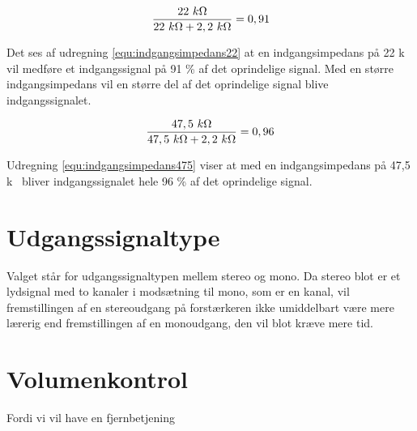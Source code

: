 \begin{equation}
\label{equ:indgangsimpedans22}
\frac{22~k\ohm}{22~k\ohm + 2,2~k\ohm} = 0,91
\end{equation}

Det ses af udregning \ref{equ:indgangsimpedans22} at en indgangsimpedans på 22 k\ohm~ vil medføre et indgangssignal på 91 \% af det oprindelige signal. Med en større indgangsimpedans vil en større del af det oprindelige signal blive indgangssignalet. 

\begin{equation}
\label{equ:indgangsimpedans475}
\frac{47,5~k\ohm}{47,5~k\ohm + 2,2~k\ohm} = 0,96
\end{equation}

Udregning \ref{equ:indgangsimpedans475} viser at med en indgangsimpedans på 47,5 k\ohm~ bliver indgangssignalet hele 96 \% af det oprindelige signal.

\section{Udgangssignaltype}
\label{krav_udgangssignaltype}
Valget står for udgangssignaltypen mellem stereo og mono. Da stereo blot er et lydsignal med to kanaler i modsætning til mono, som er en kanal, vil fremstillingen af en stereoudgang på forstærkeren ikke umiddelbart være mere lærerig end fremstillingen af en monoudgang, den vil blot kræve mere tid. 

\section{Volumenkontrol}
\label{krav_volumenkontrol}
Fordi vi vil have en fjernbetjening